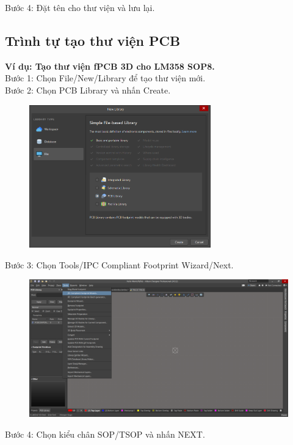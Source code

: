                 Bước 4: Đặt tên cho thư viện và lưu lại.\\
            \subsection{Trình tự tạo thư viện PCB }
                \textbf{Ví dụ: Tạo thư viện fPCB 3D cho LM358 SOP8.}\\
                Bước 1: Chọn File/New/Library để tạo thư viện mới.\\
                Bước 2: Chọn PCB Library và nhấn Create.
                \begin{figure}[H]
                    \centering
                    \includegraphics[width=0.7\textwidth]{pictures/ch3.4.png}
                \end{figure}
                Bước 3: Chọn Tools/IPC Compliant Footprint Wizard/Next.
                \begin{figure}[H]
                    \centering
                    \includegraphics[width=1\textwidth]{pictures/ch3.5.png}
                \end{figure}
                Bước 4: Chọn kiểu chân SOP/TSOP và nhấn NEXT.
